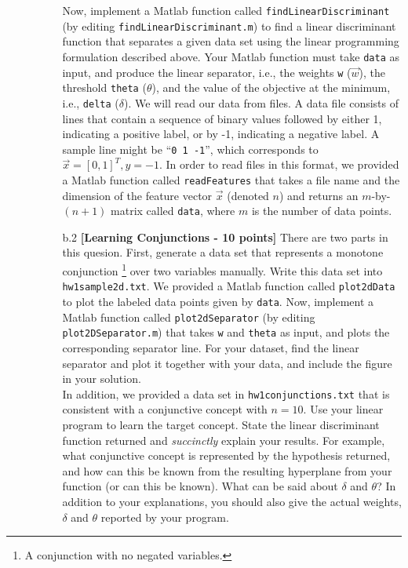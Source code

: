 \begin{enumerate}
\begin{enumerate}
\begin{enumerate}
      Now, implement     
      a Matlab function called {\tt findLinearDiscriminant}
      (by editing {\tt findLinearDiscriminant.m})
      to find a linear discriminant function that separates
      a given data set using the linear programming formulation described above.
      Your Matlab function must take {\tt data} as input,
      and produce the linear separator, i.e., 
      the weights {\tt w} ($\vec{w}$), the threshold {\tt theta} ($\theta$), 
      and the value of the objective at the minimum, i.e., {\tt delta} ($\delta$).
      We will read our data from files. 
      A data file consists of lines that contain a sequence of binary values
      followed by either 1, indicating a positive label, or by -1, indicating a negative label.
      A sample line might be ``\verb+0 1 -1+'', which corresponds to
      $\vec{x}=[0,1]^T, y=-1$.
      In order to read files in this format,
      we provided a Matlab function called {\tt readFeatures}
      that takes a file name and the dimension of the feature vector $\vec{x}$ (denoted $n$)
      and returns an $m$-by-$(n+1)$ matrix called {\tt data},
      where $m$ is the number of data points.

  \item [b.2] \textbf{[Learning Conjunctions - 10 points]} There are two parts 
    in this quesion. First, generate a data set that represents a 
      monotone conjunction \footnote{A conjunction with no negated variables.} 
      over two variables manually. Write this data set into {\tt hw1sample2d.txt}.
      We provided a Matlab function called {\tt plot2dData} to plot the labeled
      data points given by {\tt data}. 
      Now, implement
      a Matlab function called {\tt plot2dSeparator}
      (by editing {\tt plot2DSeparator.m}) that takes
      {\tt w} and {\tt theta} as input, and plots the corresponding separator line.
      For your dataset, find the linear separator and plot it together with your data,
      and include the figure in your solution.
      \ \\

      In addition,
      we provided a data set in {\tt hw1conjunctions.txt} that is consistent
      with a conjunctive concept with $n=10$.
      Use your linear program to learn the target concept.
      State the linear discriminant function returned and {\em succinctly}
      explain your results. 
      For example, what conjunctive concept is
      represented by the hypothesis returned, and how can this be known
      from the resulting hyperplane from your function (or can this be
      known). What can be said about $\delta$ and $\theta$? In addition to your
      explanations, you should also give the actual weights, $\delta$ and
      $\theta$ reported by your program.
      \ \\


\end{enumerate}
\end{enumerate}
\end{enumerate}
